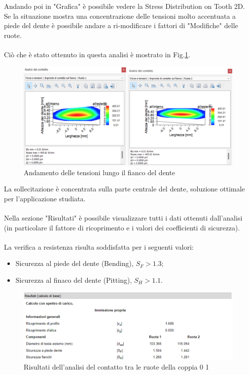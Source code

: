 Andando poi in "Grafica" è possibile vedere la Stress Distribution on Tooth 2D. \\
Se la situazione mostra una concentrazione delle tensioni molto accentuata a piede del dente è possibile andare a ri-modificare i fattori di "Modifiche" delle ruote.\\
\\
Ciò che è stato ottenuto in questa analisi è mostrato in Fig.\ref{fig:StressDistributionCoppia01}.
\begin{figure}[h]
    \centering
    \includegraphics[scale=0.6]{Immagini/StressDistributionCoppia01.png}
    \caption{Andamento delle tensioni lungo il fianco del dente}
    \label{fig:StressDistributionCoppia01}
\end{figure}

La sollecitazione è concentrata sulla parte centrale del dente, soluzione ottimale per l’applicazione studiata.\\
\\
Nella sezione "Risultati" è possibile visualizzare tutti i dati ottenuti dall’analisi (in particolare il fattore di ricoprimento e i valori dei coefficienti di sicurezza).\\
\\
La verifica a resistenza risulta soddisfatta per i seguenti valori:
\begin{itemize}
    \item Sicurezza al piede del dente (Bending), $S_F>1.3$;
    \item Sicurezza al finaco del dente (Pitting), $S_H>1.1$.
\end{itemize}
\newpage
\begin{figure}[h]
    \centering
    \includegraphics[scale=0.45]{Immagini/RisultatiCoppia01.png}
    \caption{Risultati dell'analisi del contatto tra le ruote della coppia 0 1}
    \label{fig:RisultatiCoppia01}
\end{figure}


